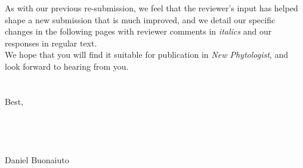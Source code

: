 \documentclass{article}[11pt]
\begin{document}
\noindent As with our previous re-submission, we feel that the reviewer's input has helped shape a new submission that is much improved, and we detail our specific changes in the following pages with reviewer comments in \emph{italics} and our responses in regular text.\\

\noindent We hope that you will find it suitable for publication in \emph{New Phytologist}, and look forward to hearing from you.\\\\\\

\noindent Best,\\
\\\\\\\\







\noindent Daniel Buonaiuto
\end{document}
